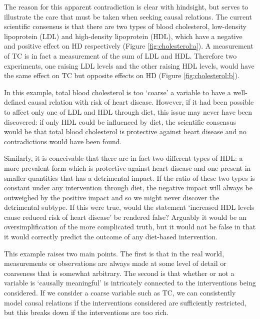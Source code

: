 The reason for this apparent contradiction is clear with hindsight, but serves to illustrate the care that must be taken when seeking causal relations. 
The current scientific consensus is that there are two types of blood cholesterol, low-density lipoprotein (LDL) and high-density lipoprotein (HDL), which have a negative and positive effect on HD respectively (Figure \ref{fig:cholesterol:a}).
A measurement of TC is in fact a measurement of the sum of LDL and HDL.
Therefore two experiments, one raising LDL levels and the other raising HDL levels, would have the same effect on TC but opposite effects on HD (Figure \ref{fig:cholesterol:b}).

In this example, total blood cholesterol is too `coarse' a variable to have a well-defined causal relation with risk of heart disease. 
However, if it had been possible to affect only one of LDL and HDL through diet, this issue may never have been discovered:
if only HDL could be influenced by diet, the scientific consensus would be that total blood cholesterol is protective against heart disease and no contradictions would have been found.

Similarly, it is conceivable that there are in fact two different types of HDL: a more prevalent form which is protective against heart disease and one present in smaller quantities that has a detrimental impact. 
If the ratio of these two types is constant under any intervention through diet, the negative impact will always be outweighed by the positive impact and so we might never discover the detrimental subtype. 
If this were true, would the statement `increased HDL levels cause reduced risk of heart disease' be rendered false? 
Arguably it would be an oversimplification of the more complicated truth, but it would not be false in that it would correctly predict the outcome of any diet-based intervention.

This example raises two main points. The first is that in the real world, measurements or observations are always made at some level of detail or coarseness that is somewhat arbitrary.
The second is that whether or not a variable is `causally meaningful' is intricately connected to the interventions being considered. If we consider a coarse variable such as TC, we can consistently model causal relations if the interventions considered are sufficiently restricted, but this breaks down if the interventions are too rich. 

